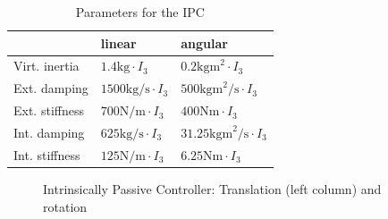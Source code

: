 \documentclass[a4paper,twoside, openright,12pt]{report}
\begin{document}
{\begin{table}
	\centering
	\caption[Parameters for the IPC]{Parameters for the IPC}\vspace{10pt}
	\label{TAB:IPCParameters}
	
	\begin{tabular}{ l | l | l }
	 & linear & angular \\ \hline
	Virt. inertia & $1.4 \text{kg} \cdot I_3$ & $0.2 \text{kgm}^2 \cdot I_3$ \\ \hline
	Ext. damping	 & $1500 \text{kg/s} \cdot I_3$ & $500 \text{kgm}^2 \text{/s} \cdot I_3$ \\ \hline
	Ext. stiffness & $700 \text{N/m} \cdot I_3$ & $400 \text{Nm} \cdot  I_3$ \\ \hline
	Int. damping & $625 \text{kg/s} \cdot I_3$ & $31.25 \text{kgm}^2 \text{/s} \cdot I_3 $ \\ \hline
	Int. stiffness & $125 \text{N/m} \cdot I_3$ & $6.25 \text{Nm} \cdot I_3$\\ \hline
\end{tabular}
\end{table}




%


\begin{figure}

\label{FIG:IPCSim}
\caption[Simulation results: Intrinsically Passive Controller]{Intrinsically Passive Controller: Translation (left column) and rotation}
\end{figure}


\clearpage
}
\end{document}
